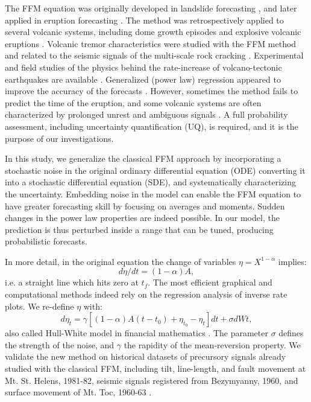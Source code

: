 \documentclass{article}
\begin{document}
The FFM equation was originally developed in landslide forecasting \citep{Voight1987, Voight1988b, Voight1989b}, and later applied in eruption forecasting \citep{Voight1988, Voight1989, Cornelius1995}. The method was retrospectively applied to several volcanic systems, including dome growth episodes and explosive volcanic eruptions \citep{Voight1991, Cornelius1994, Cornelius1996, Voight2000}. Volcanic tremor characteristics were studied with the FFM method and related to the seismic signals of the multi-scale rock cracking \citep{Kilburn1998,Ortiz2003,Kilburn2003}. Experimental and field studies of the physics behind the rate-increase of volcano-tectonic earthquakes are available \citep{Smith2009,Smith2010}. Generalized (power law) regression appeared to improve the accuracy of the forecasts \citep{Bell2011}. However, sometimes the method fails to predict the time of the eruption, and some volcanic systems are often characterized by prolonged unrest and ambiguous signals \citep{Chiodini2016}. A full probability assessment, including uncertainty quantification (UQ), is required, and it is the purpose of our investigations.

In this study, we generalize the classical FFM approach by incorporating a stochastic noise in the original ordinary differential equation (ODE) converting it into a stochastic differential equation (SDE), and systematically characterizing the uncertainty. Embedding noise in the model can enable the FFM equation to have greater forecasting skill by focusing on averages and moments. Sudden changes in the power law properties are indeed possible. In our model, the prediction is thus perturbed inside a range that can be tuned, producing probabilistic forecasts.

In more detail, in the original equation the change of variables $\eta=X^{1-\alpha}$ implies:
$$d\eta/dt=(1-\alpha)A,$$
i.e. a straight line which hits zero at $t_f$. The most efficient graphical and computational methods indeed rely on the regression analysis of inverse rate plots. We re-define $\eta$ with:
$$d\eta_t=\gamma[(1-\alpha)A(t-t_0)+\eta_{t_0}-\eta_t]dt+\sigma dWt,$$
also called Hull-White model in financial mathematics \citep{HullWhite1990}. The parameter $\sigma$ defines the strength of the noise, and $\gamma$ the rapidity of the mean-reversion property. We validate the new method on historical datasets of precursory signals already studied with the classical FFM, including tilt, line-length, and fault movement at Mt. St. Helens, 1981-82, seismic signals registered from Bezymyanny, 1960, and surface movement of Mt. Toc, 1960-63 \citep{Voight1988}.
\end{document}
